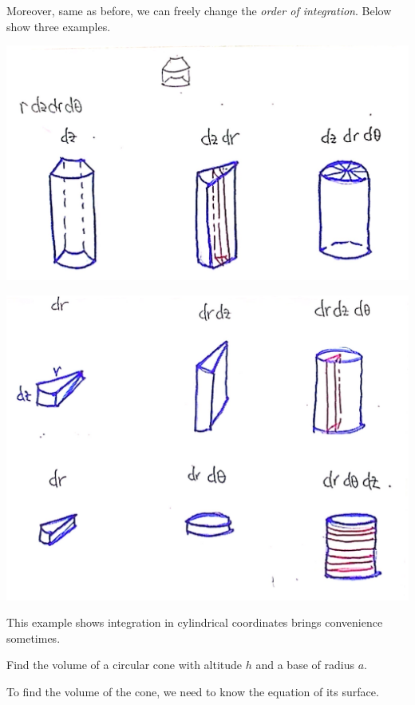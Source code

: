 \begin{spacing}{1.3}
    \newpage
    Moreover, same as before, we can freely change the {\it order of integration}.
    Below show three examples.
    \begin{center}
        \includegraphics[scale=0.20]{images/Ch14-int-cylind-ways-1.JPG}

        \includegraphics[scale=0.17]{images/Ch14-int-cylind-ways-2.JPG}
    \end{center}

    \newpage
    {\blue This example shows integration in cylindrical coordinates brings convenience sometimes.}

    \eg Find the volume of a circular cone with altitude $h$ and a base of radius $a$.
    
    \sol To find the volume of the cone, we need to know the equation of its surface.


\end{spacing}
